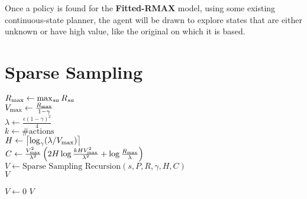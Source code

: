 Once a policy is found for the {\bf Fitted-RMAX} model, using some existing continuous-state planner, the agent will be drawn to explore states that are either unknown or have high value, like the original  on which it is based.



\section{Sparse Sampling}

\label{sec:rel:ss}

\begin{algorithm}[tb]
	\caption{$\mbox{Sparse~Sampling}(s, P, R, \gamma, \epsilon, \delta)$}
	\label{alg:ss}
	$R_{\rm max} \leftarrow \max_{sa}R_{sa}$\\
	$V_{\rm max} \leftarrow \frac{R_{\rm max}}{1-\gamma}$\\
	$\lambda \leftarrow \frac{\epsilon(1-\gamma)^2} 4$\\
	$k \leftarrow \#\mbox{actions}$\\
	$H \leftarrow \left\lceil\log_\gamma(\lambda/V_{\rm max})\right\rceil$\\
	$C \leftarrow \frac {V_{\rm max}^2}{\lambda^2}\left(2H\log\frac{kHV_{\rm max}^2}{\lambda^2}+\log\frac{R_{\rm max}}{\lambda}\right)$\\
	$V \leftarrow \mbox{Sparse~Sampling~Recursion}(s, P, R, \gamma, H, C)$\\
	\Return $V$
\end{algorithm}

\begin{algorithm}[tb]
	\caption{$\mbox{Sparse~Sampling~Recursion}(s, P, R, \gamma, d, C)$}
	\label{alg:ssr}
	 {
		$V \leftarrow 0$
	}
	\Return $V$
\end{algorithm}

